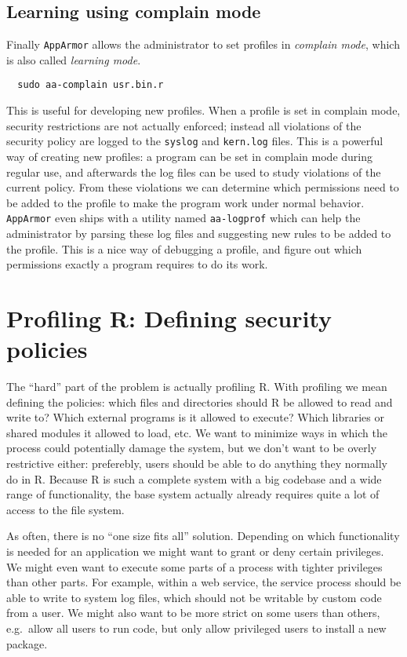 \documentclass{jss}
\newcommand{\R}{\textsf{R}\xspace}
\newcommand{\AppArmor}{\texttt{AppArmor}\xspace}
\begin{document}
\subsection{Learning using complain mode}

Finally \AppArmor allows the administrator to set profiles in \emph{complain
mode}, which is also called \emph{learning mode}.
\begin{verbatim}
  sudo aa-complain usr.bin.r
\end{verbatim}
This is useful for developing new profiles. When a profile is set in complain
mode, security restrictions are not actually enforced; instead all violations
of the security policy are logged to the \texttt{syslog} and \texttt{kern.log}
files. This is a powerful way of creating new profiles: a program can be set in
complain mode during regular use, and afterwards the log files can be used to
study violations of the current policy. From these violations we can determine
which permissions need to be added to the profile to make the program work
under normal behavior. \AppArmor even ships with a utility named
\texttt{aa-logprof} which can help the administrator by parsing these log files and
suggesting new rules to be added to the profile. This is a nice way of
debugging a profile, and figure out which permissions exactly a program
requires to do its work.

\section[Profiling R: Defining security policies]{Profiling \R: Defining
security policies}

The ``hard'' part of the problem is actually profiling \R. With
profiling we mean defining the policies: which files and directories should
\R be allowed to read and write to? Which external programs is it
allowed to execute? Which libraries or shared modules it allowed to load, etc.
We want to minimize ways in which the process could potentially damage the
system, but we don't want to be overly restrictive either: preferebly, users
should be able to do anything they normally do in \R. Because \R is
such a complete system with a big codebase and a wide range of functionality,
the base system actually already requires quite a lot of access to the file
system.

As often, there is no ``one size fits all'' solution. Depending on which
functionality is needed for an application we might want to grant or deny
certain privileges. We might even want to execute some parts of a process with
tighter privileges than other parts. For example, within a web service, the
service process should be able to write to system log files, which should not be
writable by custom code from a user. We might also want to be more strict on
some users than others, e.g.\ allow all users to run code, but only allow
privileged users to install a new package.
\end{document}
